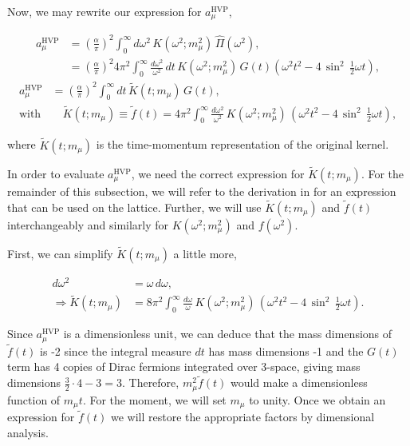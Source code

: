 \documentclass{article}
\numberwithin{equation}{section} %
\begin{document}
Now, we may rewrite our expression for $a_\mu^\mathrm{HVP}$,

\begin{equation}
\begin{split}
a_\mu^\mathrm{HVP} &= \left(\frac{\alpha}{\pi}\right)^2 \int_0^\infty d\omega^2 \, K(\omega^2;m_\mu^2) \,\hat{\Pi}(\omega^2),\\
&= \left(\frac{\alpha}{\pi}\right)^2 4\pi^2  \int_0^\infty \frac{d\omega^2}{\omega^2} \, dt\, K(\omega^2;m_\mu^2) \,G(t) \left( \omega^2 t^2-4\,\sin^2\, \frac{1}{2}\omega t \right),
\end{split}
\end{equation}
\begin{equation}
\begin{split}
a_\mu^\mathrm{HVP}&= \left(\frac{\alpha}{\pi}\right)^2  \int_0^\infty dt\, \tilde{K}(t;m_\mu) \,G(t) ,\\
\mathrm{with}& \quad \tilde{K}(t;m_\mu) \equiv \tilde{f}(t) = 4\pi^2 \int_0^\infty \frac{d\omega^2}{\omega^2} \, K(\omega^2;m_\mu^2) \,\left( \omega^2t^2-4\,\sin^2\, \frac{1}{2}\omega t \right),
\end{split}
\label{amu}
\end{equation}

\noindent where $\tilde{K}(t;m_\mu)$ is the time-momentum representation of the original kernel.

In order to evaluate $a_\mu^\mathrm{HVP}$, we need the correct expression for $\tilde{K}(t;m_\mu)$. For the remainder of this subsection, we will refer to the derivation in \cite{dellamorte} for an expression that can be used on the lattice. Further, we will use $\tilde{K}(t;m_\mu)$ and $\tilde{f}(t)$ interchangeably and similarly for $K(\omega^2;m_\mu^2)$ and $f(\omega^2)$. 

First, we can simplify $\tilde{K}(t;m_\mu)$ a little more,

\begin{equation}
\begin{split}
d\omega^2 &= \omega \, d\omega ,\\
\Rightarrow \tilde{K}(t;m_\mu) &= 8\pi^2 \int_0^\infty \frac{d\omega}{\omega} \, K(\omega^2;m_\mu^2) \,\left( \omega^2t^2-4\,\sin^2\, \frac{1}{2}\omega t \right).
\end{split}
\end{equation}

Since $a_\mu^\mathrm{HVP}$  is a dimensionless unit, we can deduce that the mass dimensions of $\tilde{f}(t)$ is -2 since the integral measure $dt$ has mass dimensions -1 and the $G(t)$ term has 4 copies of Dirac fermions integrated over 3-space, giving mass dimensions $\frac{3}{2}\cdot 4 - 3 = 3$. Therefore, $m_\mu^2 \tilde{f}(t)$ would make a dimensionless function of $m_\mu t$. For the moment, we will set $m_\mu$ to unity. Once we obtain an expression for $\tilde{f}(t)$ we will restore the appropriate factors by dimensional analysis.
\end{document}
